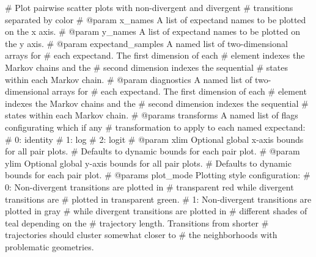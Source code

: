 \documentclass[
  letterpaper,
  DIV=11,
  numbers=noendperiod]{scrartcl}
\newenvironment{Shaded}{\begin{snugshade}}{\end{snugshade}}
\newcommand{\CommentTok}[1]{\textcolor[rgb]{0.37,0.37,0.37}{#1}}
\begin{document}
\begin{Shaded}
\begin{Highlighting}[]
\CommentTok{\# Plot pairwise scatter plots with non{-}divergent and divergent }
\CommentTok{\# transitions separated by color}
\CommentTok{\# @param x\_names A list of expectand names to be plotted on the x axis.}
\CommentTok{\# @param y\_names A list of expectand names to be plotted on the y axis.}
\CommentTok{\# @param expectand\_samples A named list of two{-}dimensional arrays for }
\CommentTok{\#                          each expectand.  The first dimension of each}
\CommentTok{\#                          element indexes the Markov chains and the }
\CommentTok{\#                          second dimension indexes the sequential }
\CommentTok{\#                          states within each Markov chain.}
\CommentTok{\# @param diagnostics A named list of two{-}dimensional arrays for }
\CommentTok{\#                    each expectand.  The first dimension of each}
\CommentTok{\#                    element indexes the Markov chains and the }
\CommentTok{\#                    second dimension indexes the sequential }
\CommentTok{\#                    states within each Markov chain.}
\CommentTok{\# @params transforms A named list of flags configurating which if any}
\CommentTok{\#                    transformation to apply to each named expectand:}
\CommentTok{\#                      0: identity}
\CommentTok{\#                      1: log}
\CommentTok{\#                      2: logit}
\CommentTok{\# @param xlim       Optional global x{-}axis bounds for all pair plots.}
\CommentTok{\#                   Defaults to dynamic bounds for each pair plot.}
\CommentTok{\# @param ylim       Optional global y{-}axis bounds for all pair plots.}
\CommentTok{\#                   Defaults to dynamic bounds for each pair plot.}
\CommentTok{\# @params plot\_mode Plotting style configuration: }
\CommentTok{\#                     0: Non{-}divergent transitions are plotted in }
\CommentTok{\#                        transparent red while divergent transitions are}
\CommentTok{\#                        plotted in transparent green.}
\CommentTok{\#                     1: Non{-}divergent transitions are plotted in gray }
\CommentTok{\#                        while divergent transitions are plotted in }
\CommentTok{\#                        different shades of teal depending on the }
\CommentTok{\#                        trajectory length.  Transitions from shorter}
\CommentTok{\#                        trajectories should cluster somewhat closer to }
\CommentTok{\#                        the neighborhoods with problematic geometries.}

\end{Highlighting}
\end{Shaded}
\end{document}
